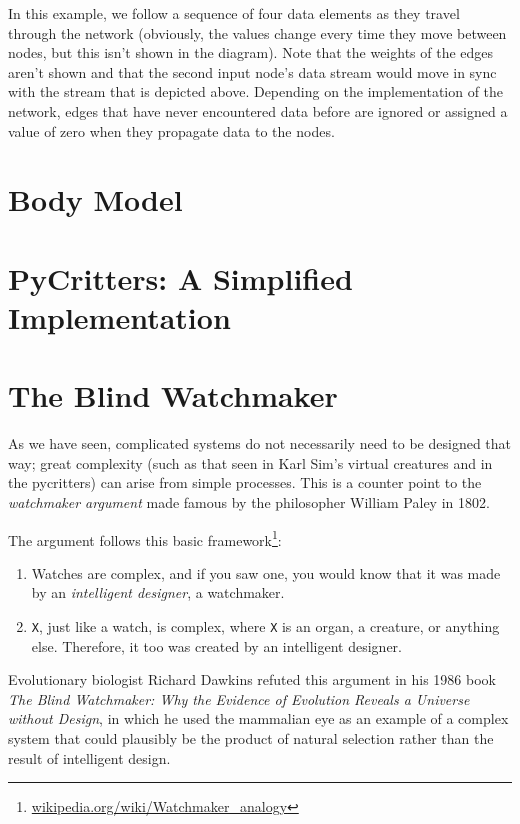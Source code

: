 In this example, we follow a sequence of four data elements as they travel 
through the network (obviously, the values change every time they move between 
nodes, but this isn't shown in the diagram). Note that the weights of the edges 
aren't shown and that the second input node's data stream would move in sync 
with the stream that is depicted above. Depending on the implementation of the 
network, edges that have never encountered data before are ignored or assigned a 
value of zero when they propagate data to the nodes.

\section{Body Model}

\section{PyCritters: A Simplified Implementation}


\section{The Blind Watchmaker}

As we have seen, complicated systems do not necessarily need to be designed that
way; great complexity (such as that seen in Karl Sim's virtual creatures and in the pycritters) 
can arise from simple processes. This is a counter point to the {\em watchmaker
argument} made famous by the philosopher William Paley in 1802. 

The argument follows this basic
framework\footnote{\url{wikipedia.org/wiki/Watchmaker_analogy}}:

\begin{enumerate}
  \item Watches are complex, and if you saw one, you would know that it was made
  by an {\em intelligent designer}, a watchmaker.

  \item {\tt X}, just like a watch, is complex, where {\tt X} is an organ, a
  creature, or anything else. Therefore, it too was created by
  an intelligent designer.
\end{enumerate}

Evolutionary biologist Richard Dawkins refuted this argument in his 1986 book
{\em The Blind Watchmaker: Why the Evidence of Evolution Reveals a Universe
without Design}, in which he used the mammalian eye as an example of a complex
system that could plausibly be the product of natural selection rather than the
result of intelligent design.

